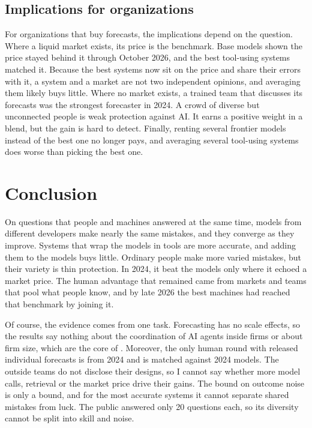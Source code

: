 \documentclass[11pt,a4paper]{article}
\theoremstyle{definition}
\begin{document}
\subsection{Implications for organizations}

For organizations that buy forecasts, the implications depend on the question. Where a liquid market exists, its price is the benchmark. Base models shown the price stayed behind it through October 2026, and the best tool-using systems matched it. Because the best systems now sit on the price and share their errors with it, a system and a market are not two independent opinions, and averaging them likely buys little. Where no market exists, a trained team that discusses its forecasts was the strongest forecaster in 2024. A crowd of diverse but unconnected people is weak protection against AI. It earns a positive weight in a blend, but the gain is hard to detect. Finally, renting several frontier models instead of the best one no longer pays, and averaging several tool-using systems does worse than picking the best one.

\section{Conclusion}\label{sec:conclusion}

On questions that people and machines answered at the same time, models from different developers make nearly the same mistakes, and they converge as they improve. Systems that wrap the models in tools are more accurate, and adding them to the models buys little. Ordinary people make more varied mistakes, but their variety is thin protection. In 2024, it beat the models only where it echoed a market price. The human advantage that remained came from markets and teams that pool what people know, and by late 2026 the best machines had reached that benchmark by joining it.

Of course, the evidence comes from one task. Forecasting has no scale effects, so the results say nothing about the coordination of AI agents inside firms or about firm size, which are the core of \citet{imas2026organizing}. Moreover, the only human round with released individual forecasts is from 2024 and is matched against 2024 models. The outside teams do not disclose their designs, so I cannot say whether more model calls, retrieval or the market price drive their gains. The bound on outcome noise is only a bound, and for the most accurate systems it cannot separate shared mistakes from luck. The public answered only 20 questions each, so its diversity cannot be split into skill and noise.
\end{document}
